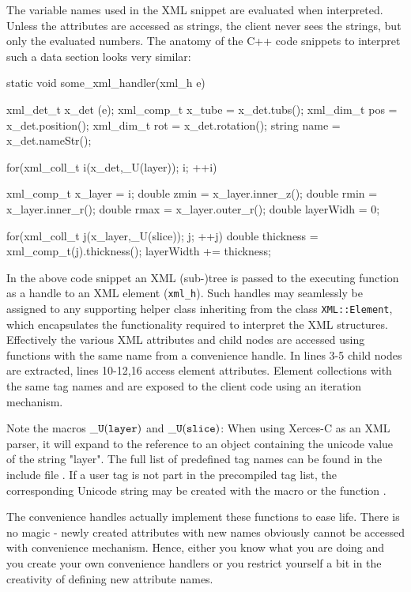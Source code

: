 \documentclass[10pt,a4paper]{article}
\begin{document}
The variable names used in the XML snippet are evaluated when interpreted.
Unless the attributes are accessed as strings, the client never sees the 
strings, but only the evaluated numbers.
The anatomy of the C++ code snippets to interpret such a data section 
looks very similar:
\begin{code}
  static void some_xml_handler(xml_h e)  {
    xml_det_t  x_det  (e);
    xml_comp_t x_tube    = x_det.tubs();
    xml_dim_t  pos       = x_det.position();
    xml_dim_t  rot       = x_det.rotation();
    string     name      = x_det.nameStr();
      
    for(xml_coll_t i(x_det,_U(layer)); i; ++i)  {
      xml_comp_t x_layer = i;
      double  zmin = x_layer.inner_z();
      double  rmin = x_layer.inner_r();
      double  rmax = x_layer.outer_r();
      double  layerWidh = 0;
        
      for(xml_coll_t j(x_layer,_U(slice)); j; ++j)  {
        double thickness = xml_comp_t(j).thickness();
        layerWidth += thickness;
      }
    }
  }
\end{code}
In the above code snippet an XML (sub-)tree is passed to the executing 
function as a handle to an XML element ({\tt{xml\_h}}). Such handles may seamlessly be
assigned to any supporting helper class inheriting from the
class {\tt{XML::Element}}, which encapsulates the functionality required to 
interpret the XML structures.
Effectively the various XML attributes and child nodes 
are accessed using functions with the same
name from a convenience handle. 
In lines 3-5 child nodes are extracted, lines 10-12,16 access element attributes.
Element collections with the same tag names  and  are exposed
to the client code using an iteration mechanism.

\noindent
Note the macros $\tt{\_U(layer)}$ and $\tt{\_U(slice)}$: 
When using Xerces-C as an XML parser, 
it will expand to the reference to an object containing the unicode value 
of the string "layer". The full list of predefined tag names can be found in the
include file .
If a user tag is not part in the precompiled tag list, the corresponding Unicode
string may be created with the macro  or the function
.

\noindent
The convenience handles actually implement
these functions to ease life. There is no magic - newly created attributes
with new names obviously cannot be accessed with convenience mechanism.
Hence, either you know what you are doing and you create your own 
convenience handlers or you restrict yourself a bit in the creativity
of defining new attribute names.
\end{document}
